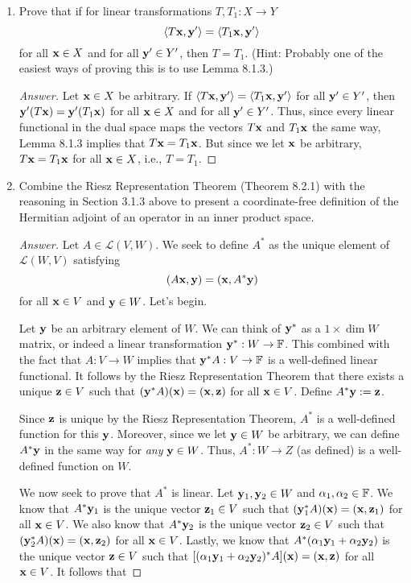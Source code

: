 \documentclass[../psets.tex]{subfiles}
\begin{document}
\begin{enumerate}[label={\textbf{3.\arabic*.}}]
    \item Prove that if for linear transformations $T,T_1:X\to Y$
    \begin{equation*}
        \left\langle{T\mathbf{x}},{\mathbf{y}'}\right\rangle = \left\langle{T_1\mathbf{x}},{\mathbf{y}'}\right\rangle
    \end{equation*}
    for all $\mathbf{x}\in X$ and for all $\mathbf{y}'\in Y'$, then $T=T_1$. (Hint: Probably one of the easiest ways of proving this is to use Lemma 8.1.3.)
    \begin{proof}[Answer]
        Let $\mathbf{x}\in X$ be arbitrary. If $\left\langle{T\mathbf{x}},{\mathbf{y}'}\right\rangle=\left\langle{T_1\mathbf{x}},{\mathbf{y}'}\right\rangle$ for all $\mathbf{y}'\in Y'$, then $\mathbf{y}'(T\mathbf{x})=\mathbf{y}'(T_1\mathbf{x})$ for all $\mathbf{x}\in X$ and for all $\mathbf{y}'\in Y'$. Thus, since every linear functional in the dual space maps the vectors $T\mathbf{x}$ and $T_1\mathbf{x}$ the same way, Lemma 8.1.3 implies that $T\mathbf{x}=T_1\mathbf{x}$. But since we let $\mathbf{x}$ be arbitrary, $T\mathbf{x}=T_1\mathbf{x}$ for all $\mathbf{x}\in X$, i.e., $T=T_1$.
    \end{proof}
    \item Combine the Riesz Representation Theorem (Theorem 8.2.1) with the reasoning in Section 3.1.3 above to present a coordinate-free definition of the Hermitian adjoint of an operator in an inner product space.
    \begin{proof}[Answer]
        Let $A\in\mathcal{L}(V,W)$. We seek to define $A^*$ as the unique element of $\mathcal{L}(W,V)$ satisfying
        \begin{equation*}
            (A\mathbf{x},\mathbf{y}) = (\mathbf{x},A^*\mathbf{y})
        \end{equation*}
        for all $\mathbf{x}\in V$ and $\mathbf{y}\in W$. Let's begin.\par
        Let $\mathbf{y}$ be an arbitrary element of $W$. We can think of $\mathbf{y}^*$ as a $1\times\dim W$ matrix, or indeed a linear transformation $\mathbf{y}^*:W\to\mathbb{F}$. This combined with the fact that $A:V\to W$ implies that $\mathbf{y}^*A:V\to\mathbb{F}$ is a well-defined linear functional. It follows by the Riesz Representation Theorem that there exists a unique $\mathbf{z}\in V$ such that $(\mathbf{y}^*A)(\mathbf{x})=(\mathbf{x},\mathbf{z})$ for all $\mathbf{x}\in V$. Define $A^*\mathbf{y}:=\mathbf{z}$.\par
        Since $\mathbf{z}$ is unique by the Riesz Representation Theorem, $A^*$ is a well-defined function for this $\mathbf{y}$. Moreover, since we let $\mathbf{y}\in W$ be arbitrary, we can define $A^*\mathbf{y}$ in the same way for \emph{any} $\mathbf{y}\in W$. Thus, $A^*:W\to Z$ (as defined) is a well-defined function on $W$.\par
        We now seek to prove that $A^*$ is linear. Let $\mathbf{y}_1,\mathbf{y}_2\in W$ and $\alpha_1,\alpha_2\in\mathbb{F}$. We know that $A^*\mathbf{y}_1$ is the unique vector $\mathbf{z}_1\in V$ such that $(\mathbf{y}_1^*A)(\mathbf{x})=(\mathbf{x},\mathbf{z}_1)$ for all $\mathbf{x}\in V$. We also know that $A^*\mathbf{y}_2$ is the unique vector $\mathbf{z}_2\in V$ such that $(\mathbf{y}_2^*A)(\mathbf{x})=(\mathbf{x},\mathbf{z}_2)$ for all $\mathbf{x}\in V$. Lastly, we know that $A^*(\alpha_1\mathbf{y}_1+\alpha_2\mathbf{y}_2)$ is the unique vector $\mathbf{z}\in V$ such that $[(\alpha_1\mathbf{y}_1+\alpha_2\mathbf{y}_2)^*A](\mathbf{x})=(\mathbf{x},\mathbf{z})$ for all $\mathbf{x}\in V$. It follows that

\end{proof}
\end{enumerate}
\end{document}
